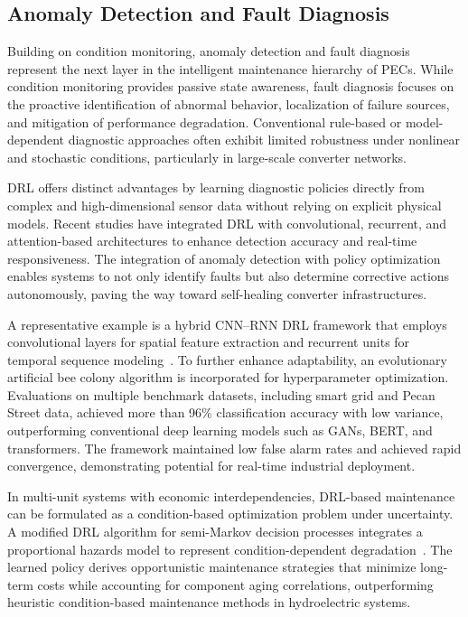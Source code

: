 \subsection{Anomaly Detection and Fault Diagnosis}
\label{sec:fault_diagnosis}

Building on condition monitoring, anomaly detection and fault diagnosis represent the next layer in the intelligent maintenance hierarchy of PECs. 
While condition monitoring provides passive state awareness, fault diagnosis focuses on the proactive identification of abnormal behavior, localization of failure sources, and mitigation of performance degradation. 
Conventional rule-based or model-dependent diagnostic approaches often exhibit limited robustness under nonlinear and stochastic conditions, particularly in large-scale converter networks.

DRL offers distinct advantages by learning diagnostic policies directly from complex and high-dimensional sensor data without relying on explicit physical models. 
Recent studies have integrated DRL with convolutional, recurrent, and attention-based architectures to enhance detection accuracy and real-time responsiveness. 
The integration of anomaly detection with policy optimization enables systems to not only identify faults but also determine corrective actions autonomously, paving the way toward self-healing converter infrastructures.

A representative example is a hybrid CNN–RNN DRL framework that employs convolutional layers for spatial feature extraction and recurrent units for temporal sequence modeling~\cite{nevisi2025evolutionary}. 
To further enhance adaptability, an evolutionary artificial bee colony algorithm is incorporated for hyperparameter optimization. 
Evaluations on multiple benchmark datasets, including smart grid and Pecan Street data, achieved more than 96\% classification accuracy with low variance, outperforming conventional deep learning models such as GANs, BERT, and transformers. 
The framework maintained low false alarm rates and achieved rapid convergence, demonstrating potential for real-time industrial deployment.

In multi-unit systems with economic interdependencies, DRL-based maintenance can be formulated as a condition-based optimization problem under uncertainty. 
A modified DRL algorithm for semi-Markov decision processes integrates a proportional hazards model to represent condition-dependent degradation~\cite{najafi2023deep}. 
The learned policy derives opportunistic maintenance strategies that minimize long-term costs while accounting for component aging correlations, outperforming heuristic condition-based maintenance methods in hydroelectric systems.

